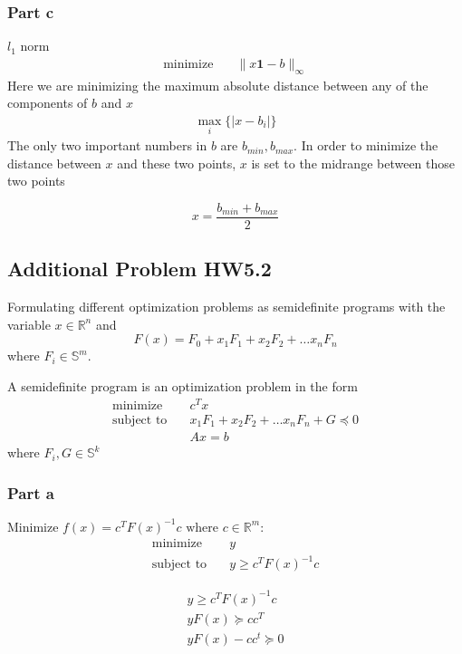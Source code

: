 \subsubsection{Part c}
$l_1$ norm
\begin{align}
  \text{minimize} & \quad \| x \textbf{1} - b \|_\infty
\end{align}
Here we are minimizing the maximum absolute distance between any of the components of $b$ and $x$
\begin{equation}
  \begin{aligned}
    \max_i \{ |x-b_i| \}
  \end{aligned}
\end{equation}
The only two important numbers in $b$ are $b_{min}, b_{max}$. In order to minimize the distance between $x$ and these two points, $x$ is set to the midrange between those two points

\begin{equation}
  x = \frac{b_{min} + b_{max}}{2}
\end{equation}

\subsection{Additional Problem HW5.2}
Formulating different optimization problems as semidefinite programs with the variable $x \in \mathbb{R}^n$ and
\begin{equation}
  F(x) = F_0 + x_1F_1 + x_2F_2 + \dots x_n F_n
\end{equation}
where $F_i \in \mathbb{S}^m$.

A semidefinite program is an optimization problem in the form 
\begin{align}
  \text{minimize} & \quad c^T x \\
  \text{subject to} & \quad x_1 F_1 + x_2F_2 + \dots x_nF_n + G \preceq 0 \\
  & \quad Ax = b
\end{align}
where $F_i, G \in \mathbb{S}^k$
\subsubsection{Part a}
Minimize $f(x) = c^T F(x)^{-1} c \text{ where } c \in \mathbb{R}^m$:
\begin{align}
  \text{minimize} & \quad y \\
  \text{subject to} & \quad y \geq c^T F(x)^{-1} c
\end{align}

\begin{equation}
  \begin{aligned}
    y \geq c^T F(x)^{-1} c \\
    y F(x) \succeq c c ^T \\
    y F(x) - cc^t \succeq 0
  \end{aligned}
\end{equation}

